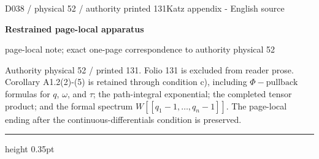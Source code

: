 \documentclass[9pt]{article}
\newcommand{\CanonText}[1]{\par{\fontsize{8.0}{9.35}\selectfont\RaggedRight #1\par}\vspace{2.2pt}}
\newcommand{\LayerTitle}{Restrained page-local apparatus}
\begin{document}
\noindent\begin{minipage}[t][\dimexpr\textheight-5pt\relax][t]{\textwidth}
{\sffamily\fontsize{7.3}{8.2}\selectfont\color{Quiet} D038 / physical 52 / authority printed 131\hfill Katz appendix - English source}
\par{}\vspace{4.5pt}
{\sffamily\fontsize{10.4}{11.6}\selectfont\bfseries\color{Accent} \LayerTitle}
\par{\sffamily\fontsize{6.7}{7.7}\selectfont\color{Quiet} page-local note; exact one-page correspondence to authority physical 52}
\vspace{5pt}
\CanonText{Authority physical 52 / printed 131. Folio 131 is excluded from reader prose. Corollary A1.2(2)-(5) is retained through condition c), including \(\Phi{}-\text{pullback}\) formulas for \(q\), \(\omega{}\), and \(\tau{}\); the path-integral exponential; the completed tensor product; and the formal spectrum \(W[[q_{1}-1,\ldots{},q_{n}-1]]\). The page-local ending after the continuous-differentials condition is preserved.}
\vfill
{\color{Accent}\hrule height 0.35pt}\vspace{3pt}
\end{minipage}
\newpage
\end{document}
